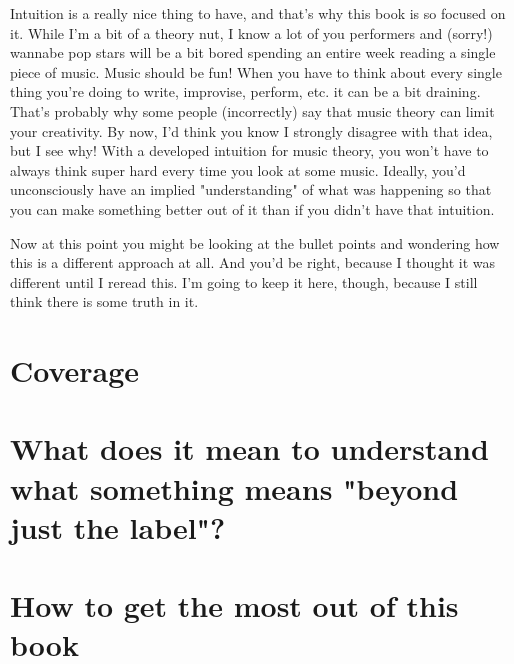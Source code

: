 \documentclass[../OpenAppliedMusicTheory.tex]{subfiles}
\begin{document}
    Intuition is a really nice thing to have, and that's why this book is so focused on it. While I'm a bit of a theory nut, I know a lot of you performers and (sorry!) wannabe pop stars will be a bit bored spending an entire week reading a single piece of music. Music should be fun! When you have to think about every single thing you're doing to write, improvise, perform, etc. it can be a bit draining. That's probably why some people (incorrectly) say that music theory can limit your creativity. By now, I'd think you know I strongly disagree with that idea, but I see why! With a developed intuition for music theory, you won't have to always think super hard every time you look at some music. Ideally, you'd unconsciously have an implied "understanding" of what was happening so that you can make something better out of it than if you didn't have that intuition.

    Now at this point you might be looking at the bullet points and wondering how this is a different approach at all. And you'd be right, because I thought it was different until I reread this. I'm going to keep it here, though, because I still think there is some truth in it. %

    \section*{Coverage}

    \section*{What does it mean to understand what something means "beyond just the label"?}

    \section*{How to get the most out of this book}
\end{document}
